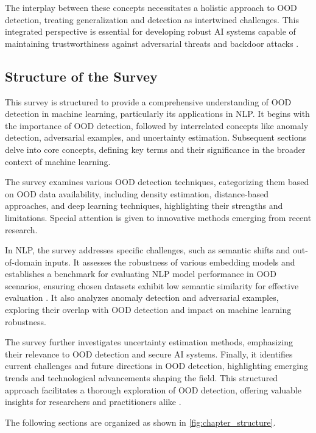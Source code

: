 The interplay between these concepts necessitates a holistic approach to OOD detection, treating generalization and detection as intertwined challenges. This integrated perspective is essential for developing robust AI systems capable of maintaining trustworthiness against adversarial threats and backdoor attacks \cite{HowGoodAre3}.

\subsection{Structure of the Survey} \label{subsec:Structure of the Survey}

This survey is structured to provide a comprehensive understanding of OOD detection in machine learning, particularly its applications in NLP. It begins with the importance of OOD detection, followed by interrelated concepts like anomaly detection, adversarial examples, and uncertainty estimation. Subsequent sections delve into core concepts, defining key terms and their significance in the broader context of machine learning.

The survey examines various OOD detection techniques, categorizing them based on OOD data availability, including density estimation, distance-based approaches, and deep learning techniques, highlighting their strengths and limitations. Special attention is given to innovative methods emerging from recent research.

In NLP, the survey addresses specific challenges, such as semantic shifts and out-of-domain inputs. It assesses the robustness of various embedding models and establishes a benchmark for evaluating NLP model performance in OOD scenarios, ensuring chosen datasets exhibit low semantic similarity for effective evaluation \cite{yuan2023revisiting}. It also analyzes anomaly detection and adversarial examples, exploring their overlap with OOD detection and impact on machine learning robustness.

The survey further investigates uncertainty estimation methods, emphasizing their relevance to OOD detection and secure AI systems. Finally, it identifies current challenges and future directions in OOD detection, highlighting emerging trends and technological advancements shaping the field. This structured approach facilitates a thorough exploration of OOD detection, offering valuable insights for researchers and practitioners alike \cite{lang2023survey}.


The following sections are organized as shown in \autoref{fig:chapter_structure}.








